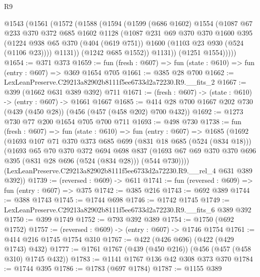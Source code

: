 \begin{lexlean}{R9}
\begin{coremodule}
      @1543
        (@1561
          (@1572
            (@1588
              (@1594
                (@1599
                  (@686 @1602)
                  @1554
                  (@1087
                    @67
                    @233
                    @370
                    @372
                    @685
                    @1602
                    @1128
                    (@1087
                      @231
                      @69
                      @370
                      @370
                      @1600
                      @395
                      (@1224
                        @938
                        @65
                        @370
                        (@404 (@619 @751))
                        @1600
                        (@1103 @23 @930 (@524 (@1106 @23))))
                      @1131))
                  (@1242 @685 @1552))
                @1131))
            (@1251 @1554)))))
@1654 := @371 @373
@1659 := fun (fresh : @607) => fun (state : @610) => fun (entry : @607) => @369 @1654 @705
@1661 := @385 @28 @700
@1662 := LexLeanPreserve.C29213a82902b8111f5ee6733d2a72230.R9.__fits_2
@1667 := @399 (@1662 @631 @389 @392) @711
@1671 := (fresh : @607) -> (state : @610) -> (entry : @607) -> @1661 @1667
@1685 := @414 @28 @700 @1667 @202 @730 (@439 (@450 @28)) (@456 (@457 (@458 @202) @700 @432))
@1692 := @1273 @730 @77 @200 @1654 @705 @700 @711
@1693 := @498 @730
@1738 := fun (fresh : @607) =>
  fun (state : @610) =>
  fun (entry : @607) =>
  @1685
    (@1692
      (@1693
        @107
        @71
        @370
        @373
        @685
        @699
        (@831 @18 @685 (@524 (@834 @18)))
        (@1693
          @65
          @70
          @370
          @372
          @694
          @698
          @837
          (@1693 @67 @69 @370 @370 @696 @395 (@831 @28 @696 (@524 (@834 @28))) (@544 @730))))
      (LexLeanPreserve.C29213a82902b8111f5ee6733d2a72230.R9.__rel_4 @631 @389 @392))
@1739 := (reversed : @609) -> @611
@1741 := fun (reversed : @609) => fun (entry : @607) => @375
@1742 := @385 @216
@1743 := @692 @389
@1744 := @388 @1743
@1745 := @1744 @698
@1746 := @1742 @1745
@1749 := LexLeanPreserve.C29213a82902b8111f5ee6733d2a72230.R9.__fits_6 @389 @392
@1750 := @399 @1749
@1752 := @793 @392 @389
@1754 := @1750 (@692 @1752)
@1757 := (reversed : @609) -> (entry : @607) -> @1746 @1754
@1761 := @414 @216 @1745 @1754 @310
@1767 := @422 (@426 @696) (@422 (@429 @1743) @432)
@1777 := @1761 @1767 (@439 (@450 @216)) (@456 (@457 (@458 @310) @1745 @432))
@1783 := @1141 @1767 @136 @42 @308 @373 @370
@1784 := @1744 @395
@1786 := @1783 (@697 @1784)
@1787 := @1155 @389

\end{coremodule}
\end{lexlean}
